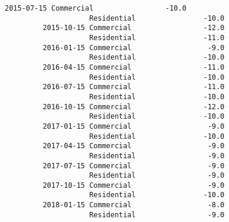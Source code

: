 \documentclass[11pt]{article}
\begin{document}
\begin{Verbatim}[commandchars=\\\{\}]
         2015-07-15 Commercial                 -10.0   
                    Residential                -10.0   
         2015-10-15 Commercial                 -12.0   
                    Residential                -11.0   
         2016-01-15 Commercial                  -9.0   
                    Residential                -10.0   
         2016-04-15 Commercial                 -11.0   
                    Residential                -10.0   
         2016-07-15 Commercial                 -11.0   
                    Residential                -10.0   
         2016-10-15 Commercial                 -12.0   
                    Residential                -10.0   
         2017-01-15 Commercial                  -9.0   
                    Residential                -10.0   
         2017-04-15 Commercial                  -9.0   
                    Residential                 -9.0   
         2017-07-15 Commercial                  -9.0   
                    Residential                 -9.0   
         2017-10-15 Commercial                  -9.0   
                    Residential                -10.0   
         2018-01-15 Commercial                  -8.0   
                    Residential                 -9.0   
         

\end{Verbatim}
\end{document}
